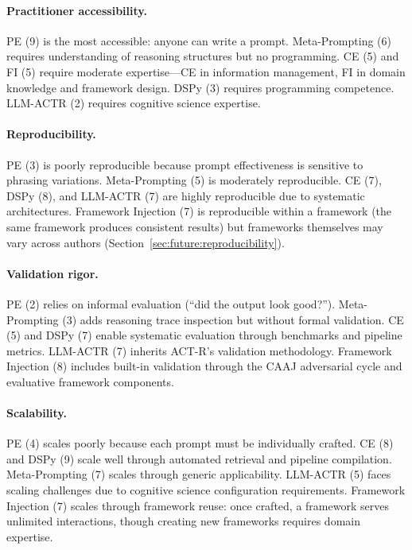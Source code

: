 \documentclass[12pt,a4paper]{article}
\begin{document}
\paragraph{Practitioner accessibility.}
PE (9) is the most accessible: anyone can write a prompt. Meta-Prompting (6) requires understanding of reasoning structures but no programming. CE (5) and FI (5) require moderate expertise---CE in information management, FI in domain knowledge and framework design. DSPy (3) requires programming competence. LLM-ACTR (2) requires cognitive science expertise.

\paragraph{Reproducibility.}
PE (3) is poorly reproducible because prompt effectiveness is sensitive to phrasing variations. Meta-Prompting (5) is moderately reproducible. CE (7), DSPy (8), and LLM-ACTR (7) are highly reproducible due to systematic architectures. Framework Injection (7) is reproducible within a framework (the same framework produces consistent results) but frameworks themselves may vary across authors (Section~\ref{sec:future:reproducibility}).

\paragraph{Validation rigor.}
PE (2) relies on informal evaluation (``did the output look good?''). Meta-Prompting (3) adds reasoning trace inspection but without formal validation. CE (5) and DSPy (7) enable systematic evaluation through benchmarks and pipeline metrics. LLM-ACTR (7) inherits ACT-R's validation methodology. Framework Injection (8) includes built-in validation through the CAAJ adversarial cycle and evaluative framework components.

\paragraph{Scalability.}
PE (4) scales poorly because each prompt must be individually crafted. CE (8) and DSPy (9) scale well through automated retrieval and pipeline compilation. Meta-Prompting (7) scales through generic applicability. LLM-ACTR (5) faces scaling challenges due to cognitive science configuration requirements. Framework Injection (7) scales through framework reuse: once crafted, a framework serves unlimited interactions, though creating new frameworks requires domain expertise.
\end{document}
